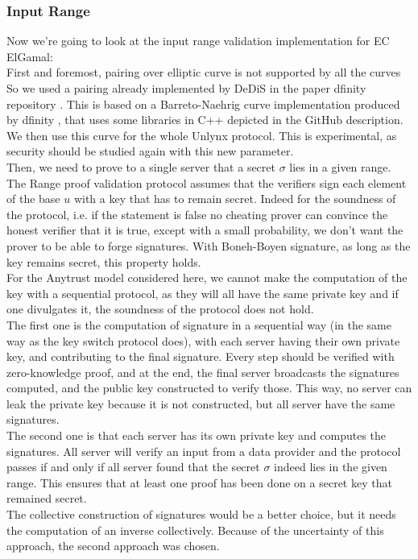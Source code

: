 \documentclass{article}
\begin{document}
\subsubsection*{Input Range}
Now we're going to look at the input range validation implementation for EC ElGamal:\\

First and foremost, pairing over elliptic curve is not supported by all the curves So we used a pairing already implemented by DeDiS in the paper dfinity repository \cite{dfinitydedis}.  This is based on a Barreto-Naehrig curve implementation produced by dfinity \cite{dfinity}, that uses some libraries in C++ depicted in the GitHub description. We then use this curve for the whole Unlynx protocol. This is experimental, as security should be studied again with this new parameter.\\

Then, we need to prove to a single server that a secret $\sigma$ lies in a given range. 
The Range proof validation protocol assumes that the verifiers sign each element of the base $u$ with a key that has to remain secret. Indeed for the soundness of the protocol, i.e. if the statement is false no cheating prover can convince the honest verifier that it is true, except with a small probability, we don't want the prover to be able to forge signatures.
With Boneh-Boyen signature, as long as the key remains secret, this property holds.\\
For the Anytrust model considered here, we cannot make the computation of the key with a sequential protocol, as they will all have the same private key and if one divulgates it, the soundness of the protocol does not hold. \\
 The first one is the computation of signature in a sequential way (in the same way as the key switch protocol does), with each server having their own private key, and contributing to the final signature. Every step should be verified with zero-knowledge proof, and at the end, the final server broadcasts the signatures computed, and the public key constructed to verify those. This way, no server can leak the private key because it is not constructed, but all server have the same signatures. \\
The second one is that each server has its own private key and computes the signatures. All server will verify an input from a data provider and the protocol passes if and only if all server found that the secret $\sigma$ indeed lies in the given range. This ensures that at least one proof has been done on a secret key that remained secret.\\
The collective construction of signatures would be a better choice, but it needs the computation of an inverse collectively. Because of the uncertainty of this approach, the second approach was chosen.
\end{document}

